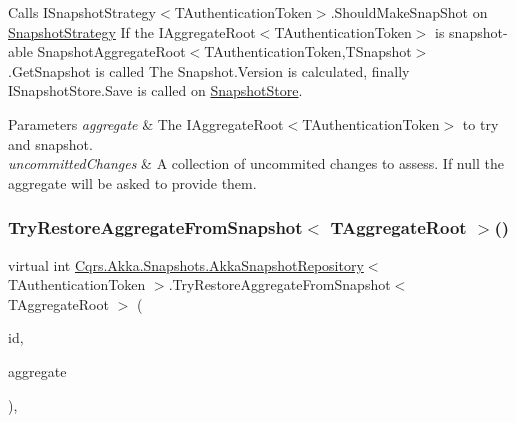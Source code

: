 Calls I\+Snapshot\+Strategy$<$\+T\+Authentication\+Token$>$.\+Should\+Make\+Snap\+Shot on \hyperlink{classCqrs_1_1Akka_1_1Snapshots_1_1AkkaSnapshotRepository_ad230c1d7f2d70973cdf116b14fcd0ab0_ad230c1d7f2d70973cdf116b14fcd0ab0}{Snapshot\+Strategy} If the I\+Aggregate\+Root$<$\+T\+Authentication\+Token$>$ is snapshot-\/able Snapshot\+Aggregate\+Root$<$\+T\+Authentication\+Token,\+T\+Snapshot$>$.\+Get\+Snapshot is called The Snapshot.\+Version is calculated, finally I\+Snapshot\+Store.\+Save is called on \hyperlink{classCqrs_1_1Akka_1_1Snapshots_1_1AkkaSnapshotRepository_a83f16c1598f3df2a8889fdf5cab5dfb9_a83f16c1598f3df2a8889fdf5cab5dfb9}{Snapshot\+Store}. 


\begin{DoxyParams}{Parameters}
{\em aggregate} & The I\+Aggregate\+Root$<$\+T\+Authentication\+Token$>$ to try and snapshot.\\
\hline
{\em uncommitted\+Changes} & A collection of uncommited changes to assess. If null the aggregate will be asked to provide them.\\
\hline
\end{DoxyParams}
\mbox{\label{classCqrs_1_1Akka_1_1Snapshots_1_1AkkaSnapshotRepository_aeec6fc99d17848302d908361ea407908_aeec6fc99d17848302d908361ea407908}} 
\subsubsection{\texorpdfstring{Try\+Restore\+Aggregate\+From\+Snapshot$<$ T\+Aggregate\+Root $>$()}{TryRestoreAggregateFromSnapshot< TAggregateRoot >()}}
{\footnotesize\ttfamily virtual int \hyperlink{classCqrs_1_1Akka_1_1Snapshots_1_1AkkaSnapshotRepository}{Cqrs.\+Akka.\+Snapshots.\+Akka\+Snapshot\+Repository}$<$ T\+Authentication\+Token $>$.Try\+Restore\+Aggregate\+From\+Snapshot$<$ T\+Aggregate\+Root $>$ (\begin{DoxyParamCaption}\item[{Guid}]{id,  }\item[{T\+Aggregate\+Root}]{aggregate }\end{DoxyParamCaption})\hspace{0.3cm}{\ttfamily [protected]}, {\ttfamily [virtual]}}



